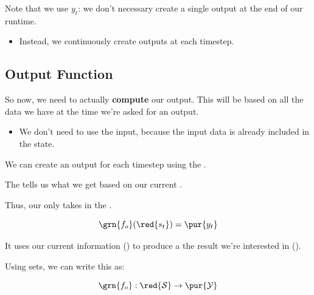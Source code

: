         Note that we use $y_t$: we don't necessary create a single output at the end of our runtime.
        
        \begin{itemize}
            \item Instead, we continuously create outputs at each timestep.
        \end{itemize}



    \phantom{}

    \subsection{Output Function}
        
        So now, we need to actually \textbf{compute} our output. This will be based on all the data we have  at the time we're asked for an output.

        \begin{itemize}
            \item We don't need to use the input, because the input data is already included in the state.
        \end{itemize}

        We can create an output for each timestep using the .\\

        \begin{definition}
            The   tells us what  we get based on our current .
            
            Thus, our  only takes in the . 
            
            \begin{equation*}
                \grn{f_o}(\red{s_t}) = \pur{y_t}
            \end{equation*}
            
            It uses our current information () to produce a the result we're interested in ().
            
            Using sets, we can write this as:
            
            \begin{equation*}
                \grn{f_o}: \red{\mathcal{S}} \rightarrow \pur{\mathcal{Y}}
            \end{equation*}
        \end{definition}
        
